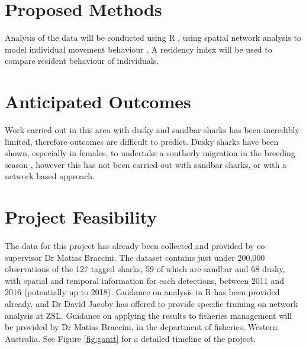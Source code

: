 \documentclass[11pt,a4paper,titlepage]{article}
\begin{document}
	
	\section{Proposed Methods}
	
	Analysis of the data will be conducted using R \cite{RCoreTeam2015}, using spatial network analysis to model individual movement behaviour \cite{Jacoby2016}. A residency index will be used to compare resident behaviour of individuals. 

	
	\section{Anticipated Outcomes}
	
	Work carried out in this area with dusky and sandbar sharks has been incredibly limited, therefore outcomes are difficult to predict. Dusky sharks have been shown, especially in females, to undertake a southerly migration in the breeding season \cite{Braccini2018}, however this has not been carried out with sandbar sharks, or with a network based approach.
	
	\section{Project Feasibility}
	
	\paragraph{}The data for this project has already been collected and provided by co-supervisor Dr Matias Braccini. The dataset contains just under 200,000 observations of the 127 tagged sharks, 59 of which are sandbar and 68 dusky, with spatial and temporal information for each detections, between 2011 and 2016 (potentially up to 2018). Guidance on analysis in R has been provided already, and Dr David Jacoby has offered to provide specific training on network analysis at ZSL. Guidance on applying the results to fisheries management will be provided by Dr Matias Braccini, in the department of fisheries, Western Australia. See Figure \ref{fig:gantt} for a detailed timeline of the project.
\end{document}
